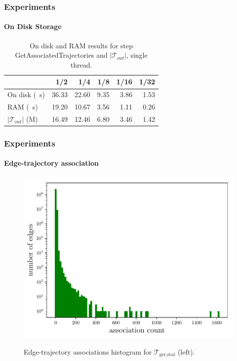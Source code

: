 \documentclass{beamer}
\newcommand{\getAssociatedTrajectories}{GetAssociatedTrajectories\xspace}
\newcommand{\traj}[2]{\mathcal{T}_{\text{#1},\text{#2}}}
\begin{document}
\begin{frame}
	\frametitle{Experiments}
	\framesubtitle{On Disk Storage}
	\begin{table}
		{
			\caption{On disk and RAM results for step \getAssociatedTrajectories and $|\mathcal{T}_{out}|$, single thread.}
			\begin{tabular}{|l||r|r|r|r|r|}
				\hline
				                          & 1/2   & 1/4   & 1/8  & 1/16 & 1/32 \\
				\hline
				On disk (\SI{}{s})        & 36.33 & 22.60 & 9.35 & 3.86 & 1.53 \\
				RAM (\SI{}{s})            & 19.20 & 10.67 & 3.56 & 1.11 & 0.26 \\
				$|\mathcal{T}_{out}|$ (M) & 16.49 & 12.46 & 6.80 & 3.46 & 1.42 \\
				\hline
			\end{tabular}
		}
	\end{table}
\end{frame}

\begin{frame}
	\frametitle{Experiments}
	\framesubtitle{Edge-trajectory association}
	\begin{figure}
		{\includegraphics[width=.4\linewidth]{plots/osmGerHist.pdf} }
		\caption{Edge-trajectory associations histogram  for $\traj{ger}{real}$ (left).}
	\end{figure}
\end{frame}

\end{document}
